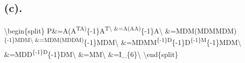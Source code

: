 \documentclass[11pt]{article}
\begin{document}
    \hypertarget{c.}{%
\subsection{(c).}\label{c.}}

\textbackslash{}begin\{split\}
P\&=A(A\textsuperscript{TA)}\{-1\}A\textsuperscript{T\textbackslash{}
\&=A(AA)}\{-1\}A\textbackslash{}
\&=MDM(MDMMDM)\textsuperscript{\{-1\}MDM\textbackslash{}
\&=MDM(MDDM)}\{-1\}MDM\textbackslash{}
\&=MDMM\textsuperscript{\{-1\}D}\{-1\}D\textsuperscript{\{-1\}M}\{-1\}MDM\textbackslash{}
\&=MDD\textsuperscript{\{-1\}D}\{-1\}DM\textbackslash{}
\&=MM\textbackslash{} \&=I\_\{6\}\textbackslash{}
\textbackslash{}end\{split\}


    
    
    
    
\end{document}
